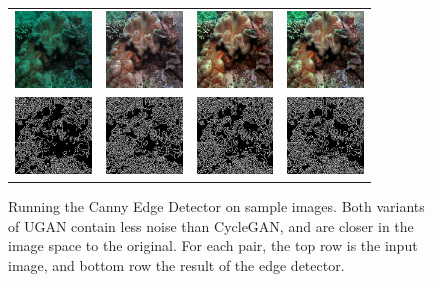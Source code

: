 \documentclass[letterpaper, 10pt, conference]{ieeeconf}
\begin{document}
\begin{figure}
\begin{tabular}{p{1.7cm} p{1.7cm} p{1.7cm} p{1.7cm}}
   \includegraphics[width=0.8in]{4_original} &
   \includegraphics[width=0.8in]{4_cimg} &
   \includegraphics[width=0.8in]{4_u0img} &
   \includegraphics[width=0.8in]{4_u1img} \\ [-1ex]
   \includegraphics[width=0.8in]{4_oedges} &
   \includegraphics[width=0.8in]{4_cedges} &
   \includegraphics[width=0.8in]{4_u0edges} &
   \includegraphics[width=0.8in]{4_u1edges} \\

\end{tabular}
\caption{Running the Canny Edge Detector on sample images. Both variants of UGAN contain less noise than CycleGAN,
and are closer in the image space to the original. For each pair, the top row is the input image, and bottom row
the result of the edge detector.}
\end{figure}
\end{document}
